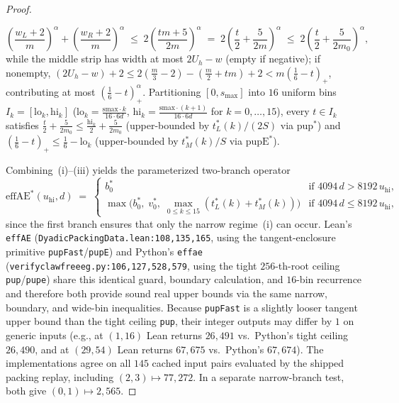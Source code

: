 \documentclass[11pt,reqno]{amsart}
\theoremstyle{plain}
\theoremstyle{definition}
\theoremstyle{remark}
\DeclareRobustCommand{\_}{\ifmmode\text{\textunderscore}\else\textunderscore\allowbreak\fi}
\begin{document}
\begin{proof}
\begin{enumerate}[label=(\roman*),leftmargin=2em]
  \[
    \left(\frac{w_L + 2}{m}\right)^{\!\alpha} + \left(\frac{w_R + 2}{m}\right)^{\!\alpha} \;\le\; 2\left(\frac{t m + 5}{2m}\right)^{\!\alpha} \;=\; 2\left(\frac{t}{2} + \frac{5}{2m}\right)^{\!\alpha} \;\le\; 2\left(\frac{t}{2} + \frac{5}{2m_0}\right)^{\!\alpha},
  \]
  while the middle strip has width at most $2U_h - w$ (empty if negative); if nonempty, $(2U_h - w) + 2 \le 2(\frac{m}{3} - 2) - (\frac{m}{2} + t m) + 2 < m(\frac{1}{6} - t)_+$, contributing at most $(\frac{1}{6} - t)_+^\alpha$. Partitioning $[0, s_{\max}]$ into $16$ uniform bins $I_k = [\mathrm{lo}_k, \mathrm{hi}_k]$ ($\mathrm{lo}_k = \frac{\mathrm{smax}\cdot k}{16 \cdot 6d}$, $\mathrm{hi}_k = \frac{\mathrm{smax}\cdot (k + 1)}{16 \cdot 6d}$ for $k = 0, \dots, 15$), every $t \in I_k$ satisfies $\frac{t}{2} + \frac{5}{2m_0} \le \frac{\mathrm{hi}_k}{2} + \frac{5}{2m_0}$ (upper-bounded by $t_L^*(k)/(2S)$ via $\mathrm{pup}^*$) and $(\frac{1}{6} - t)_+ \le \frac{1}{6} - \mathrm{lo}_k$ (upper-bounded by $t_M^*(k)/S$ via $\mathrm{pupE}^*$).
\end{enumerate}
Combining~(i)--(iii) yields the parameterized two-branch operator
\[
  \mathrm{effAE}^*(u_{\mathrm{hi}}, d) \;=\;
  \begin{cases}
    b_0^* & \text{if } 4094\, d > 8192\, u_{\mathrm{hi}},\\[2pt]
    \max\!\bigl(b_0^*,\; v_0^*,\; \max_{0 \le k \le 15}(t_L^*(k) + t_M^*(k))\bigr) & \text{if } 4094\, d \le 8192\, u_{\mathrm{hi}},
  \end{cases}
\]
since the first branch ensures that only the narrow regime~(i) can occur. Lean's \texttt{effAE} (\texttt{DyadicPackingData.lean:108,135,165}, using the tangent-enclosure primitive \texttt{pupFast}/\texttt{pupE}) and Python's \texttt{eff\_a\_e} (\texttt{verify\_clawfree\_eg.py:106,127,528,579}, using the tight $256$-th-root ceiling \texttt{pup}/\texttt{pup\_e}) share this identical guard, boundary calculation, and $16$-bin recurrence and therefore both provide sound real upper bounds via the same narrow, boundary, and wide-bin inequalities. Because \texttt{pupFast} is a slightly looser tangent upper bound than the tight ceiling \texttt{pup}, their integer outputs may differ by $1$ on generic inputs (e.g., at $(1, 16)$ Lean returns $26{,}491$ vs.\ Python's tight ceiling $26{,}490$, and at $(29, 54)$ Lean returns $67{,}675$ vs.\ Python's $67{,}674$). The implementations agree on all $145$ cached input pairs evaluated by the shipped packing replay, including $(2, 3) \mapsto 77{,}272$. In a separate narrow-branch test, both give $(0, 1) \mapsto 2{,}565$.
\end{proof}
\end{document}
